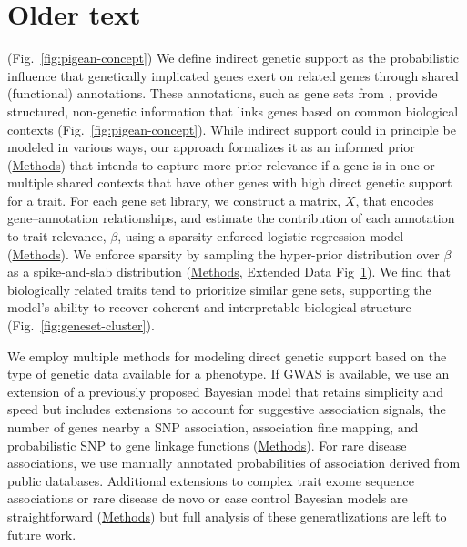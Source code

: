 \documentclass[sn-nature,lineno]{sn-jnl}%
\theoremstyle{thmstyleone}%
\theoremstyle{thmstyletwo}%
\theoremstyle{thmstylethree}%
\begin{document}
\section{Older text}
(Fig.~\ref{fig:pigean-concept})
We define indirect genetic support as the probabilistic influence that genetically implicated genes exert on related genes through shared (functional) annotations. These annotations, such as gene sets from , provide structured, non-genetic information that links genes based on common biological contexts (Fig.~\ref{fig:pigean-concept}). While indirect support could in principle be modeled in various ways, our approach formalizes it as an informed prior (\hyperlink{pigeanpior}{Methods}) that intends to capture more prior relevance if a gene is in one or multiple shared contexts that have other genes with high direct genetic support for a trait. For each gene set library, we construct a matrix, $X$, that encodes gene–annotation relationships, and estimate the contribution of each annotation to trait relevance, $\beta$, using a sparsity-enforced logistic regression model (\hyperlink{pigeanpior}{Methods}). We enforce sparsity by sampling the hyper-prior distribution over $\beta$ as a spike-and-slab distribution \cite{mitchell_bayesian_1988,madigan_model_1994,ishwaran_spike_2005} (\hyperlink{pigeanpior}{Methods}, Extended Data Fig~\ref{}). We find that biologically related traits tend to prioritize similar gene sets, supporting the model’s ability to recover coherent and interpretable biological structure (Fig.~\ref{fig:geneset-cluster}).

We employ multiple methods for modeling direct genetic support based on the type of genetic data available for a phenotype. If GWAS is available, we use an extension of a previously proposed Bayesian model \cite{dornbos_evaluating_2022} that retains simplicity and speed but includes extensions to account for suggestive association signals, the number of genes nearby a SNP association, association fine mapping, and probabilistic SNP to gene linkage functions (\hyperlink{pigeanpior}{Methods}). For rare disease associations, we use manually annotated probabilities of association derived from public databases. Additional extensions to complex trait exome sequence associations or rare disease de novo or case control Bayesian models \cite{TADA} are straightforward (\hyperlink{pigeanpior}{Methods}) but full analysis of these generatlizations are left to future work.
\end{document}

